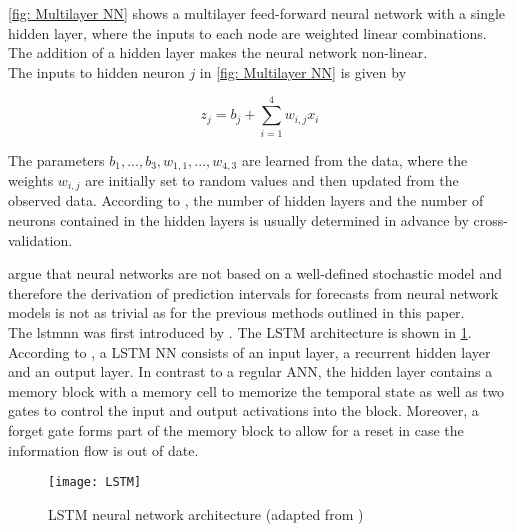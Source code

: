 \noindent \cref{fig: Multilayer NN} shows a multilayer feed-forward neural network with a single hidden layer, where the inputs to each node are weighted linear combinations. The addition of a hidden layer makes the neural network non-linear.\\ 
\newpage
The inputs to hidden neuron $j$ in \cref{fig: Multilayer NN} is given by

\begin{equation} \label{eq: inputs hidden neuron}
	z_{j} = b_{j} + \sum_{i=1}^4 w_{i,j}x_{i}
\end{equation}

The parameters $b_{1},...,b_{3}, w_{1,1},...,w_{4,3}$ are learned from the data, where the weights $w_{i,j}$ are initially set to random values and then updated from the observed data. 
According to \textcite{hyndman2018}, the number of hidden layers and the number of neurons contained in the hidden layers is usually determined in advance by cross-validation.

\noindent \textcite{hyndman2018} argue that neural networks are not based on a well-defined stochastic model and therefore the derivation of prediction intervals for forecasts from neural network models is not as trivial as for the previous methods outlined in this paper.\\

The \acrfull{lstmnn} was first introduced by \textcite{hochreiter1997}. The LSTM architecture is shown in \cref{fig: LSTM architecture}. 
\newpage
According to \textcite{ma2015}, a LSTM NN consists of an input layer, a recurrent hidden layer and an output layer. In contrast to a regular ANN, the hidden layer contains a memory block with a memory cell to memorize the temporal state as well as two gates to control the input and output activations into the block. Moreover, a forget gate forms part of the memory block to allow for a reset in case the information flow is out of date.

\begin{figure} [h]
\centering
\texttt{[image: LSTM]}
\caption{LSTM neural network architecture (adapted from \textcite{ma2015})}
\label{fig: LSTM architecture}
\end{figure}